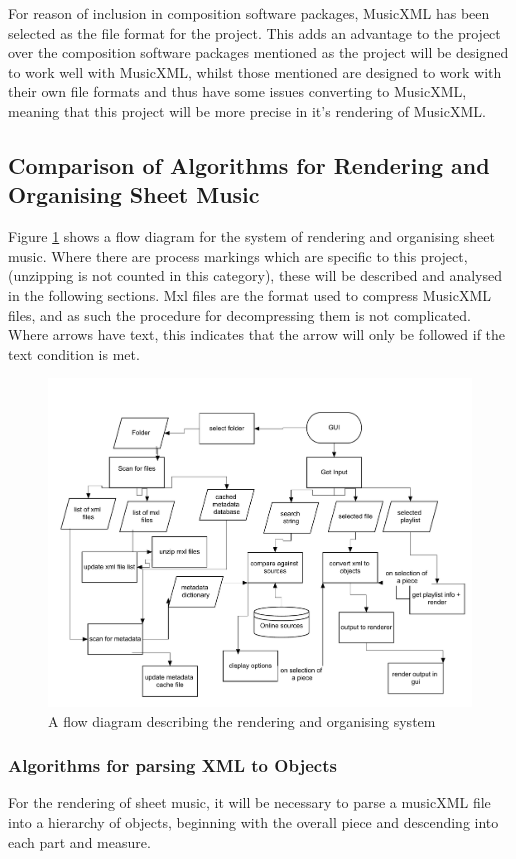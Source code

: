 For reason of inclusion in composition software packages, MusicXML has been selected as the file format for the project. This adds an advantage to the project over the composition software packages mentioned as the project will be designed to work well with MusicXML, whilst those mentioned are designed to work with their own file formats and thus have some issues converting to MusicXML\parencite{mscoreBugTracker}, meaning that this project will be more precise in it's rendering of MusicXML.

\subsection{Comparison of Algorithms for Rendering and Organising Sheet Music}
Figure \ref{fig:flow} shows a flow diagram for the system of rendering and organising sheet music. Where there are process markings which are specific to this project,(unzipping is not counted in this category), these will be described and analysed in the following sections.
Mxl files are the format used to compress MusicXML files, and as such the procedure for decompressing them is not complicated. Where arrows have text, this indicates that the arrow will only be followed if the text condition is met.
\begin{figure}[H]
    \centering
    \includegraphics[width=320pt]{flowchart}
    \caption{A flow diagram describing the rendering and organising system}
    \label{fig:flow}
\end{figure}

\subsubsection{Algorithms for parsing XML to Objects}
For the rendering of sheet music, it will be necessary to parse a musicXML file into a hierarchy of objects, beginning with the overall piece and descending into each part and measure. 

